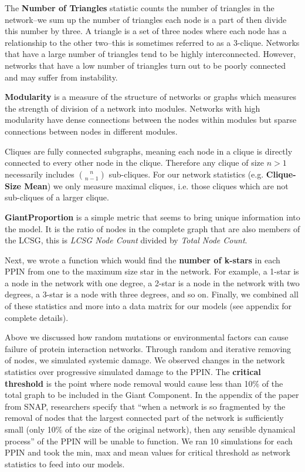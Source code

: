\documentclass[12pt]{article}
\begin{document}
The \textbf{Number of Triangles} statistic counts the number of triangles in the network--we sum up the number of triangles each node is a part of then divide this number by three. A triangle is a set of three nodes where each node has a relationship to the other two--this is sometimes referred to as a 3-clique. Networks that have a large number of triangles tend to be highly interconnected. However, networks that have a low number of triangles turn out to be poorly connected and may suffer from instability.

\textbf{Modularity} is a measure of the structure of networks or graphs which measures the strength of division of a network into modules. Networks with high modularity have dense connections between the nodes within modules but sparse connections between nodes in different modules.

Cliques are fully connected subgraphs, meaning each node in a clique is directly connected to every other node in the clique. Therefore any clique of size $n>1$ necessarily includes ${n \choose n-1}$ sub-cliques. For our network statistics (e.g. \textbf{Clique-Size Mean}) we only measure maximal cliques, i.e. those cliques which are not sub-cliques of a larger clique. 

\textbf{GiantProportion} is a simple metric that seems to bring unique information into the model. It is the ratio of nodes in the complete graph that are also members of the LCSG, this is \textit{LCSG Node Count} divided by \textit{Total Node Count}.

Next, we wrote a function which would find the \textbf{number of k-stars} in each PPIN from one to the maximum size star in the network. For example, a 1-star is a node in the network with one degree, a 2-star is a node in the network with two degrees, a 3-star is a node with three degrees, and so on. Finally, we combined all of these statistics and more into a data matrix for our models (see appendix for complete details).

Above we discussed how random mutations or environmental factors can cause failure of protein interaction networks. Through random and iterative removing of nodes, we simulated systemic damage. We observed changes in the network statistics over progressive simulated damage to the PPIN. The \textbf{critical threshold} is the point where node removal would cause less than 10\% of the total graph to be included in the Giant Component. In the appendix of the paper from SNAP, researchers specify that ``when a network is so fragmented by the removal of nodes that the largest connected part of the network is sufficiently small (only 10\% of the size of the original network), then any sensible dynamical process'' of the PPIN will be unable to function. We ran 10 simulations for each PPIN and took the min, max and mean values for critical threshold as network statistics to feed into our models.
\end{document}
